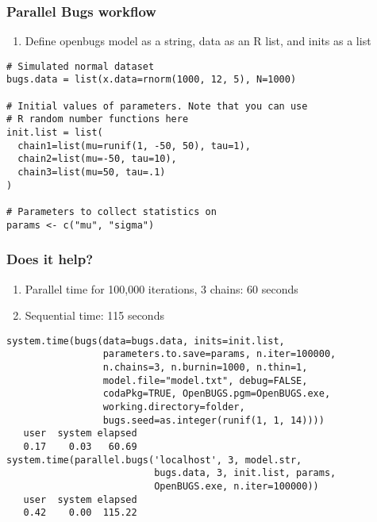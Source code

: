\documentclass{beamer}
\begin{document}
\begin{frame}[fragile]
  \frametitle{Parallel Bugs workflow}
  
  \begin{enumerate}
    \item Define openbugs model as a string, data as an R list, and inits as a list
  \end{enumerate}

  \begin{verbatim}
# Simulated normal dataset
bugs.data = list(x.data=rnorm(1000, 12, 5), N=1000)

# Initial values of parameters. Note that you can use
# R random number functions here
init.list = list(
  chain1=list(mu=runif(1, -50, 50), tau=1),
  chain2=list(mu=-50, tau=10),
  chain3=list(mu=50, tau=.1)
)

# Parameters to collect statistics on
params <- c("mu", "sigma")
  \end{verbatim}
\end{frame}


\begin{frame}[fragile]
  \frametitle{Does it help?}
  
  \begin{enumerate}
    \item Parallel time for 100,000 iterations, 3 chains: 60 seconds
    \item Sequential time: 115 seconds
  \end{enumerate}

  \begin{verbatim}
system.time(bugs(data=bugs.data, inits=init.list, 
                 parameters.to.save=params, n.iter=100000, 
                 n.chains=3, n.burnin=1000, n.thin=1,
                 model.file="model.txt", debug=FALSE, 
                 codaPkg=TRUE, OpenBUGS.pgm=OpenBUGS.exe,
                 working.directory=folder,
                 bugs.seed=as.integer(runif(1, 1, 14))))
   user  system elapsed 
   0.17    0.03   60.69
system.time(parallel.bugs('localhost', 3, model.str, 
                          bugs.data, 3, init.list, params, 
                          OpenBUGS.exe, n.iter=100000))
   user  system elapsed 
   0.42    0.00  115.22 
  \end{verbatim}
\end{frame}
\end{document}
